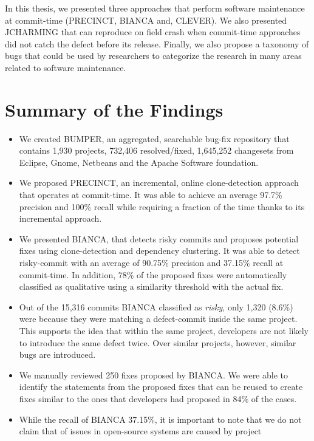 \documentclass[12pt]{report}
\begin{document}
In this thesis, we presented three approaches that perform software
maintenance at commit-time (PRECINCT, BIANCA and, CLEVER). We also
presented JCHARMING that can reproduce on field crash when commit-time
approaches did not catch the defect before its release. Finally, we also
propose a taxonomy of bugs that could be used by researchers to
categorize the research in many areas related to software maintenance.

\section{Summary of the Findings}\label{summary-of-the-findings}

\begin{itemize}
\item
  We created BUMPER, an aggregated, searchable bug-fix repository that
  contains 1,930 projects, 732,406 resolved/fixed, 1,645,252 changesets
  from Eclipse, Gnome, Netbeans and the Apache Software foundation.
\item
  We proposed PRECINCT, an incremental, online clone-detection approach
  that operates at commit-time. It was able to achieve an average 97.7\%
  precision and 100\% recall while requiring a fraction of the time
  thanks to its incremental approach.
\item
  We presented BIANCA, that detects risky commits and proposes potential
  fixes using clone-detection and dependency clustering. It was able to
  detect risky-commit with an average of 90.75\% precision and 37.15\%
  recall at commit-time. In addition, 78\% of the proposed fixes were
  automatically classified as qualitative using a similarity threshold
  with the actual fix.
\item
  Out of the 15,316 commits BIANCA classified as \emph{risky}, only
  1,320 (8.6\%) were because they were matching a defect-commit inside
  the same project. This supports the idea that within the same project,
  developers are not likely to introduce the same defect twice. Over
  similar projects, however, similar bugs are introduced.
\item
  We manually reviewed 250 fixes proposed by BIANCA. We were able to
  identify the statements from the proposed fixes that can be reused to
  create fixes similar to the ones that developers had proposed in 84\%
  of the cases.
\item
  While the recall of BIANCA 37.15\%, it is important to note that we do
  not claim that of issues in open-source systems are caused by project

\end{itemize}
\end{document}
